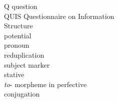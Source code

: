 \documentclass[output=paper]{langscibook}
\begin{document}
\begin{multicols}{2}
\begin{tabbing}
Q \> question\\
QUIS \> Questionnaire on Information \\ \> Structure \citep{SkopeteasEtAl2006}\\
\POT{} \> potential\\
\PRO{} \> pronoun\\
\RED{} \> reduplication\\
\SM{} \> subject marker\\
\STAT{} \> stative\\
\TO{} \> \textit{to}{}- morpheme in perfective \\ \> conjugation\\
\end{tabbing}
\end{multicols}

\printbibliography[heading=subbibliography,notkeyword=this]
\end{document}
